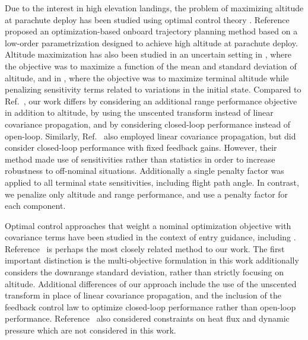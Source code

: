 \documentclass[journal ]{new-aiaa}
\begin{document}

Due to the interest in high elevation landings, the problem of maximizing altitude at parachute deploy has been studied using optimal control theory 
\cite{AltitudeOptimization,AltitudeOptimizationIndirect}. Reference \cite{GuangfeiDissertation} proposed an optimization-based onboard trajectory planning method based on a low-order parametrization designed to achieve high altitude at parachute deploy. 
Altitude maximization has also been studied in an uncertain setting in \cite{AltitudeUnderUncertainty}, where the objective was to maximize a function of the mean and standard deviation of altitude, and in \cite{MarsEntryDesensitized}, where the objective was to maximize terminal altitude while penalizing sensitivity terms related to variations in the initial state. Compared to Ref.~\cite{AltitudeUnderUncertainty}, our work differs by considering an additional range performance objective in addition to altitude, by using the unscented transform instead of linear covariance propagation, and by considering closed-loop performance instead of open-loop. Similarly, Ref.~\cite{MarsEntryDesensitized} also employed linear covariance propagation, but did consider closed-loop performance with fixed feedback gains. However, their method made use of sensitivities\cite{Desensitized} rather than statistics in order to increase robustness to off-nominal situations. Additionally a single penalty factor was applied to all terminal state sensitivities, including flight path angle. In contrast, we penalize only altitude and range performance, and use a penalty factor for each component. 

Optimal control approaches that weight a nominal optimization objective with covariance terms have been studied in the context of entry guidance, including \cite{AltitudeUnderUncertainty, MarsEntryDesensitized, EntryOUUThesis1, EntryOUUThesis2, EntryOUU}.
Reference~\cite{AltitudeUnderUncertainty} is perhaps the most closely related method to our work. The first important distinction is the multi-objective formulation in this work additionally considers the downrange standard deviation, rather than strictly focusing on altitude. Additional differences of our approach include the use of the unscented transform in place of linear covariance propagation, and the inclusion of the feedback control law to optimize closed-loop performance rather than open-loop performance. Reference~\cite{AltitudeUnderUncertainty} also considered constraints on heat flux and dynamic pressure which are not considered in this work. 
\end{document}

